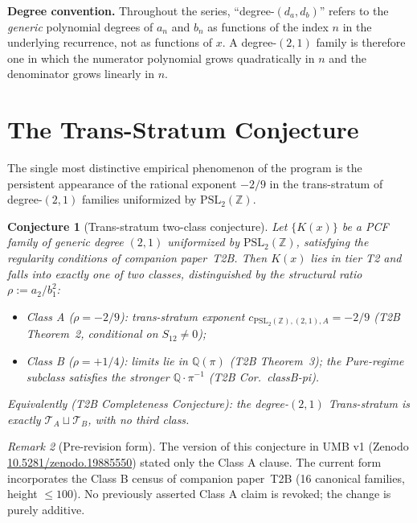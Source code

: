 \documentclass[11pt,a4paper]{article}
\newtheorem{conjecture}{Conjecture}
\theoremstyle{definition}
\theoremstyle{remark}
\newtheorem{remark}[conjecture]{Remark}
\newcommand{\PSLZ}{\mathrm{PSL}_2(\mathbb{Z})}
\begin{document}
\noindent
\textbf{Degree convention.} Throughout the series, ``degree-$(d_a, d_b)$''
refers to the \emph{generic} polynomial degrees of $a_n$ and $b_n$ as
functions of the index $n$ in the underlying recurrence, not as
functions of $x$. A degree-$(2,1)$ family is therefore one in which
the numerator polynomial grows quadratically in $n$ and the denominator
grows linearly in $n$.

\section{The Trans-Stratum Conjecture}
\label{sec:t2b}

The single most distinctive empirical phenomenon of the program is
the persistent appearance of the rational exponent $-2/9$ in the
trans-stratum of degree-$(2,1)$ families uniformized by $\PSLZ$.

\begin{conjecture}[Trans-stratum two-class conjecture]
\label{conj:t2b}
Let $\{K(x)\}$ be a PCF family of generic degree $(2,1)$
uniformized by $\PSLZ$, satisfying the regularity conditions
of companion paper~T2B.  Then $K(x)$ lies in tier T2 and falls
into exactly one of two classes, distinguished by the
structural ratio $\rho := a_2/b_1^2$:
\begin{itemize}
  \item Class A ($\rho = -2/9$): trans-stratum exponent
        $c_{\PSLZ,(2,1),A} = -2/9$ (T2B Theorem~2,
        conditional on $S_{12}\neq 0$);
  \item Class B ($\rho = +1/4$): limits lie in
        $\mathbb{Q}(\pi)$ (T2B Theorem~3); the Pure-regime
        subclass satisfies the stronger $\mathbb{Q}\cdot\pi^{-1}$
        (T2B Cor.~classB-pi).
\end{itemize}
Equivalently (T2B Completeness Conjecture): the degree-$(2,1)$
Trans-stratum is exactly $\mathcal{T}_A \sqcup \mathcal{T}_B$,
with no third class.
\end{conjecture}

\begin{remark}[Pre-revision form]
\label{rem:t2b-prerev}
The version of this conjecture in UMB v1 (Zenodo
\href{https://doi.org/10.5281/zenodo.19885550}{10.5281/zenodo.19885550})
stated only the Class A clause.  The current form incorporates the
Class B census of companion paper~T2B (16 canonical families,
height $\leq 100$).  No previously asserted Class A claim is revoked;
the change is purely additive.
\end{remark}
\end{document}
